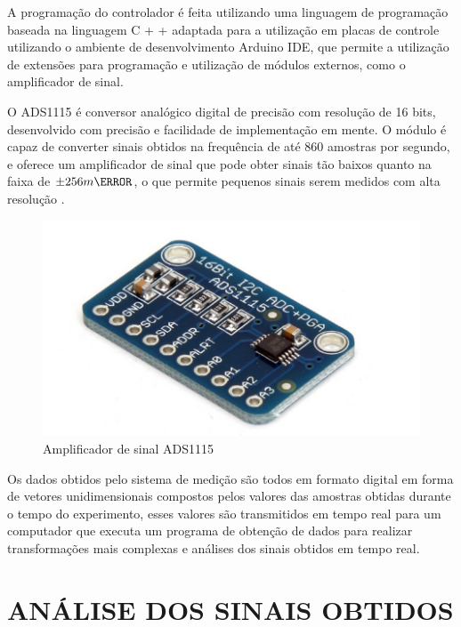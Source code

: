 A programação do controlador é feita utilizando uma linguagem de programação baseada na linguagem C + + adaptada para a utilização em placas de controle utilizando o ambiente
de desenvolvimento Arduino IDE, que permite a utilização de extensões para programação e utilização de módulos externos, como o amplificador de sinal.

O ADS1115 é conversor analógico digital de precisão com resolução de 16 bits, desenvolvido com precisão e facilidade de implementação em mente. O módulo é capaz de converter
sinais obtidos na frequência de até 860 amostras por segundo, e oferece um amplificador de sinal que pode obter sinais tão baixos quanto na faixa de ${\pm 256}{m\V}$,
o que permite pequenos sinais serem medidos com alta resolução \autocite{DocsADS1115}.

\begin{figure}[htb]
	\caption{\label{fig:1150} Amplificador de sinal ADS1115}
	\begin{center}
		\includegraphics[width=\textwidth]{pictures/1150.png}
	\end{center}
\end{figure}

Os dados obtidos pelo sistema de medição são todos em formato digital em forma de vetores unidimensionais compostos pelos valores das amostras obtidas durante o tempo do
experimento, esses valores são transmitidos em tempo real para um computador que executa um programa de obtenção de dados para realizar transformações mais complexas e
análises dos sinais obtidos em tempo real.

\section{ANÁLISE DOS SINAIS OBTIDOS}

